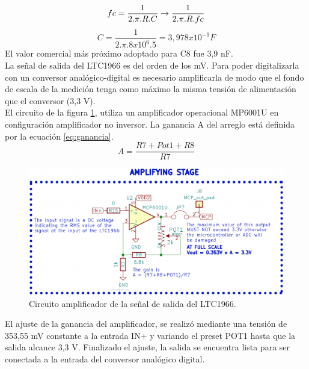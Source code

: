 \begin{equation}
	fc = \frac{1}{2.\pi.R.C}\rightarrow\frac{1}{2.\pi.R.fc}\\
\end{equation}
\begin{equation}
	\label{eq_capacitor_hpf}
	C=\frac{1}{2.\pi.{8x10^6}.5}=3,978x10^{-9} F
\end{equation}
El valor comercial más próximo adoptado para C8 fue 3,9 nF.\\
La señal de salida del LTC1966 es del orden de los mV. Para poder digitalizarla con un conversor analógico-digital es necesario amplificarla de modo que el fondo de escala de la medición tenga como máximo la misma tensión de alimentación que el conversor (3,3 V).\\
El circuito de la figura \ref{fig:ctoopamp}, utiliza un amplificador operacional MP6001U \citep{mcp6001} en configuración amplificador no inversor. La ganancia A del arreglo est\'{a} definida por la ecuación \ref{eq:ganancia}.
\begin{equation}
\label{eq:ganancia}
	A=\frac{R7+Pot1+R8}{R7}
\end{equation}

\begin{figure}[h!]
	\centering
	\includegraphics[width=1.0\linewidth]{Figures/cto_op_amp}
	\caption{Circuito amplificador de la señal de salida del LTC1966.}
	\label{fig:ctoopamp}
\end{figure}
El ajuste de la ganancia del amplificador, se realiz\'{o} mediante una tensión de 353,55 mV constante a la entrada IN+ y variando el preset POT1 hasta que la salida alcance 3,3 V. Finalizado el ajuste, la salida se encuentra lista para ser conectada a la entrada del conversor analógico digital.\\


